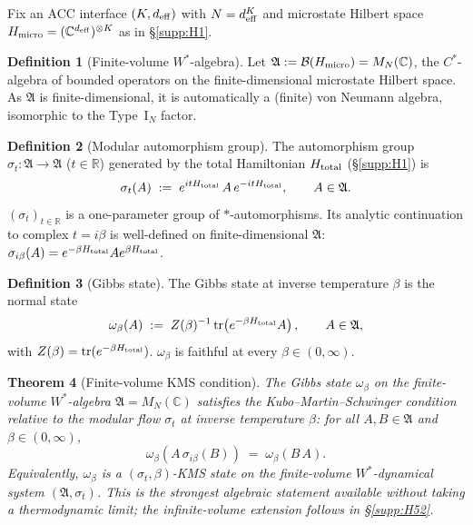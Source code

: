 \documentclass[11pt]{article}
\theoremstyle{plain}
\newtheorem{theorem}{Theorem}[section]
\theoremstyle{definition}
\newtheorem{definition}[theorem]{Definition}
\theoremstyle{remark}
\begin{document}
Fix an ACC interface $(K, d_{\rm eff})$ with $N = d_{\rm eff}^K$ and microstate Hilbert space $H_{\rm micro} = (\mathbb{C}^{d_{\rm eff}})^{\otimes K}$ as in \S\ref{supp:H1}.

\begin{definition}[Finite-volume $W^*$-algebra]\label{def:fv_walgebra}
Let $\mathfrak{A} := \mathcal{B}(H_{\rm micro}) = M_N(\mathbb{C})$, the $C^*$-algebra of bounded operators on the finite-dimensional microstate Hilbert space.  As $\mathfrak{A}$ is finite-dimensional, it is automatically a (finite) von Neumann algebra, isomorphic to the Type~I$_N$ factor.
\end{definition}

\begin{definition}[Modular automorphism group]\label{def:sigma_t}
The automorphism group $\sigma_t : \mathfrak{A} \to \mathfrak{A}$ ($t \in \mathbb{R}$) generated by the total Hamiltonian $H_{\rm total}$ (\S\ref{supp:H1}) is
\[
  \sigma_t(A) \;:=\; e^{i t H_{\rm total}}\, A\, e^{-i t H_{\rm total}}, \qquad A \in \mathfrak{A}.
\]
$(\sigma_t)_{t \in \mathbb{R}}$ is a one-parameter group of $\ast$-automorphisms.  Its analytic continuation to complex $t = i\beta$ is well-defined on finite-dimensional $\mathfrak{A}$: $\sigma_{i\beta}(A) = e^{-\beta H_{\rm total}} A e^{\beta H_{\rm total}}$.
\end{definition}

\begin{definition}[Gibbs state]\label{def:gibbs_state}
The Gibbs state at inverse temperature $\beta$ is the normal state
\[
  \omega_\beta(A) \;:=\; Z(\beta)^{-1}\, \mathrm{tr}\!\left(e^{-\beta H_{\rm total}} A\right), \qquad A \in \mathfrak{A},
\]
with $Z(\beta) = \mathrm{tr}(e^{-\beta H_{\rm total}})$.  $\omega_\beta$ is faithful at every $\beta \in (0, \infty)$.
\end{definition}

\begin{theorem}[Finite-volume KMS condition]\label{thm:kms}
The Gibbs state $\omega_\beta$ on the finite-volume $W^*$-algebra $\mathfrak{A} = M_N(\mathbb{C})$ satisfies the Kubo--Martin--Schwinger condition relative to the modular flow $\sigma_t$ at inverse temperature $\beta$: for all $A, B \in \mathfrak{A}$ and $\beta \in (0, \infty)$,
\[
  \omega_\beta(A\, \sigma_{i\beta}(B)) \;=\; \omega_\beta(B\, A).
\]
Equivalently, $\omega_\beta$ is a $(\sigma_t, \beta)$-KMS state on the \emph{finite-volume} $W^*$-dynamical system $(\mathfrak{A}, \sigma_t)$.  This is the strongest algebraic statement available without taking a thermodynamic limit; the infinite-volume extension follows in \S\ref{supp:H52}.
\end{theorem}
\end{document}
